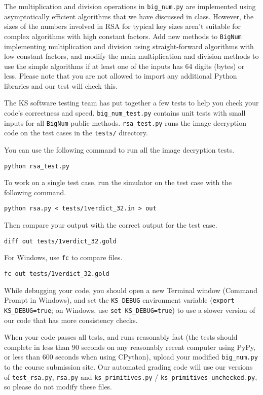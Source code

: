\documentclass[12pt,twoside]{article}
\begin{document}
\begin{problems}
\begin{problemparts}
\problempart {} The multiplication and division operations in
\texttt{big\_num.py} are implemented using asymptotically efficient algorithms
that we have discussed in class. However, the sizes of the numbers involved in
RSA for typical key sizes aren't suitable for complex algorithms with high
constant factors. Add new methods to \texttt{BigNum} implementing multiplication
and division using straight-forward algorithms with low constant factors, and
modify the main multiplication and division methods to use the simple algorithms
if at least one of the inputs has 64 digits (bytes) or less. Please note that
you are not allowed to import any additional Python libraries and our test will
check this.
\end{problemparts}

The KS software testing team has put together a few tests to help you check your
code's correctness and speed. \texttt{big\_num\_test.py} contains unit tests
with small inputs for all \texttt{BigNum} public methods.
\texttt{rsa\_test.py} runs the image decryption code on the test cases in the
\texttt{tests/} directory.

You can use the following command to run all the image decryption tests.

\texttt{python rsa\_test.py}

To work on a single test case, run the simulator on the test case with the
following command.

\texttt{python rsa.py < tests/1verdict\_32.in > out}

Then compare your output with the correct output for the test case.

\texttt{diff out tests/1verdict\_32.gold}

For Windows, use \texttt{fc} to compare files.

\texttt{fc out tests/1verdict\_32.gold}

While debugging your code, you should open a new Terminal window (Command Prompt
in Windows), and set the \texttt{KS\_DEBUG} environment variable (\texttt{export
KS\_DEBUG=true}; on Windows, use \texttt{set KS\_DEBUG=true}) to use a slower
version of our code that has more consistency checks.

When your code passes all tests, and runs reasonably fast (the tests should
complete in less than 90 seconds on any reasonably recent computer using PyPy,
or less than 600 seconds when using CPython), upload your modified
\texttt{big\_num.py} to the course submission site. Our automated grading code
will use our versions of \texttt{test\_rsa.py}, \texttt{rsa.py} and
\texttt{ks\_primitives.py} / \texttt{ks\_primitives\_unchecked.py}, so please do
not modify these files.


\end{problems}
\end{document}
